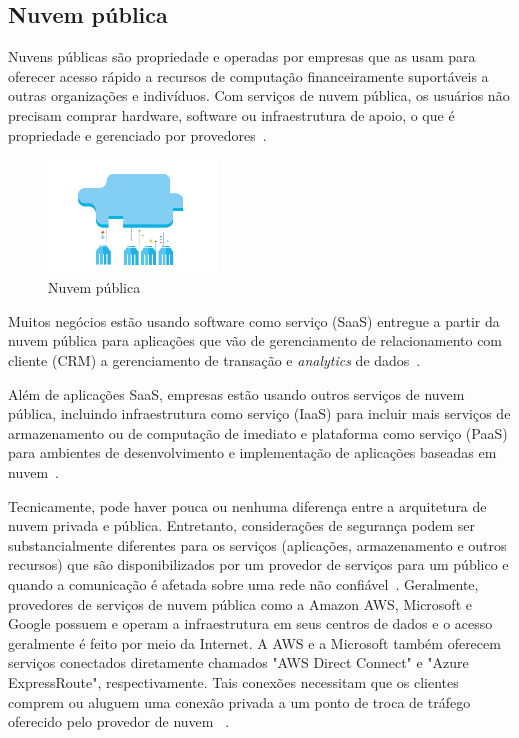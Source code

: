 \subsection{Nuvem pública}

Nuvens públicas são propriedade e operadas por empresas que as usam para
oferecer acesso rápido a recursos de computação financeiramente suportáveis a outras
organizações e indivíduos. Com serviços de nuvem pública, os usuários não precisam
comprar hardware, software ou infraestrutura de apoio, o que é propriedade e
gerenciado por provedores~\cite{ibm-what-is-cloud-computing}.

\begin{figure}[ht]
    \centering
    \includegraphics[width=0.4\textwidth]{img/public.png}
    \caption{Nuvem pública~\cite{ibm-what-is-cloud-computing}}
    \label{img:publiccloud}
\end{figure}

Muitos negócios estão usando software como serviço (SaaS) entregue a partir da nuvem 
pública para aplicações que vão de gerenciamento de relacionamento com cliente (CRM) 
a gerenciamento de transação e \emph{analytics} de 
dados~\cite{ibm-what-is-cloud-computing}.

Além de aplicações SaaS, empresas estão usando outros serviços de nuvem pública, 
incluindo infraestrutura como serviço (IaaS) para incluir mais serviços de 
armazenamento ou de computação de imediato e plataforma como serviço (PaaS) para 
ambientes de desenvolvimento e implementação de aplicações baseadas em 
nuvem~\cite{ibm-what-is-cloud-computing}.

Tecnicamente, pode haver pouca ou nenhuma diferença entre a arquitetura de nuvem 
privada e pública. Entretanto, considerações de segurança podem ser substancialmente 
diferentes para os serviços (aplicações, armazenamento e outros recursos) que são 
disponibilizados por um provedor de serviços para um público e quando a comunicação 
é afetada sobre uma rede não confiável~\cite{sequeira2015comptia}. Geralmente, 
provedores de serviços de nuvem pública como a Amazon AWS, Microsoft e Google 
possuem e operam a infraestrutura em seus centros de dados e o acesso geralmente é 
feito por meio da Internet. A AWS e a Microsoft também oferecem serviços conectados 
diretamente chamados "AWS Direct Connect" e "Azure ExpressRoute", respectivamente. 
Tais conexões necessitam que os clientes comprem ou aluguem uma conexão privada a um 
ponto de troca de tráfego oferecido pelo provedor de nuvem 
~\cite{sequeira2015comptia}.

